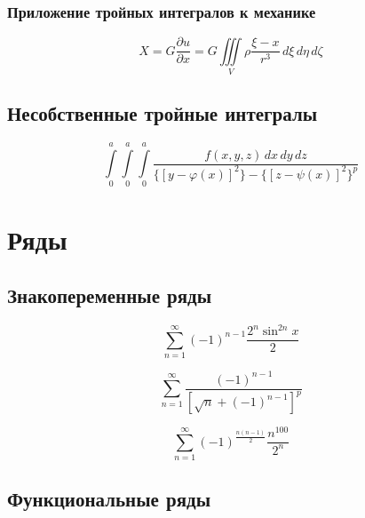 \documentclass[a4paper,14pt]{article}
\begin{document}
\subsubsection{Приложение тройных интегралов к механике}

\setcounter{equation}{0}
\begin{equation}
X= G\frac{\partial u}{\partial x} =G \iiint\limits_{V} \rho \dfrac{\xi - x}{r^3} \,d\xi \,d\eta \,d\zeta
\end{equation}

\subsection{Несобственные тройные интегралы}

\setcounter{equation}{4193}

\begin{equation}
\int\limits_{0}^{a}\int\limits_{0}^{a}\int\limits_{0}^{a} \dfrac{f(x,y,z) \,dx\,dy\,dz}{\{ [y -\varphi(x)]^{2} \} - \{ [z-\psi (x)]^{2}\}^p}
\end{equation}

\section{Ряды}

\subsection{Знакопеременные ряды}

\setcounter{equation}{2677}
\begin{equation}
\sum\limits_{n=1}^{\infty} \left(-1\right)^{n-1} \frac{2^n \sin^{2n} x}{2}
\end{equation}

\setcounter{equation}{2680}
\begin{equation}
\sum\limits_{n=1}^{\infty} \frac{\left(-1\right)^{n-1}}{\left[ \sqrt{n}+\left(-1\right)^{n-1}\right]^p}
\end{equation}

\setcounter{equation}{2683}
\begin{equation}
\sum\limits_{n=1}^{\infty} \left(-1\right)^{\frac{n\left(n-1\right)}{2}} \frac{n^{100}}{2^n}
\end{equation}

\subsection{Функциональные ряды}
\end{document}
